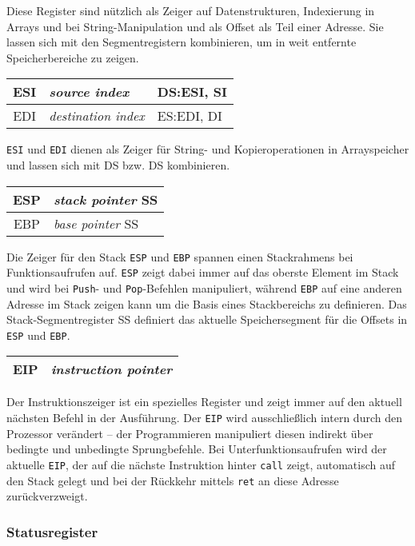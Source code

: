Diese Register sind nützlich als Zeiger auf Datenstrukturen, Indexierung in Arrays und bei String-Manipulation und als Offset als Teil einer Adresse. Sie lassen sich mit den Segmentregistern kombinieren, um in weit entfernte Speicherbereiche zu zeigen.

\begin{tabular}{|c|l|l|}
\hline ESI & \emph{source index} & DS:ESI, SI\\
\hline EDI & \emph{destination index} & ES:EDI, DI\\
\hline
\end{tabular}

{\tt ESI} und {\tt EDI} dienen als Zeiger für String- und Kopieroperationen in Arrayspeicher und lassen sich mit DS bzw. DS kombinieren.

\begin{tabular}{|c|l|}
\hline ESP & \emph{stack pointer} SS\\
\hline EBP & \emph{base pointer} SS\\
\hline
\end{tabular}

Die Zeiger für den Stack {\tt ESP} und {\tt EBP} spannen einen Stackrahmens bei Funktionsaufrufen auf. {\tt ESP} zeigt dabei immer auf das oberste Element im Stack und wird bei {\tt Push}- und {\tt Pop}-Befehlen manipuliert, während {\tt EBP} auf eine anderen Adresse im Stack zeigen kann um die Basis eines Stackbereichs zu definieren. Das Stack-Segmentregister SS definiert das aktuelle Speichersegment für die Offsets in {\tt ESP} und {\tt EBP}.

\begin{tabular}{|c|l|}
\hline EIP & \emph{instruction pointer} \\
\hline
\end{tabular}

Der Instruktionszeiger ist ein spezielles Register und zeigt immer auf den aktuell nächsten Befehl in der Ausführung. Der {\tt EIP} wird ausschließlich intern durch den Prozessor verändert – der Programmieren manipuliert diesen indirekt über bedingte und unbedingte Sprungbefehle. Bei Unterfunktionsaufrufen wird der aktuelle {\tt EIP}, der  auf die nächste Instruktion hinter {\tt call} zeigt, automatisch auf den Stack gelegt und bei der Rückkehr mittels {\tt ret} an diese Adresse zurückverzweigt.

\subsubsection{Statusregister}

